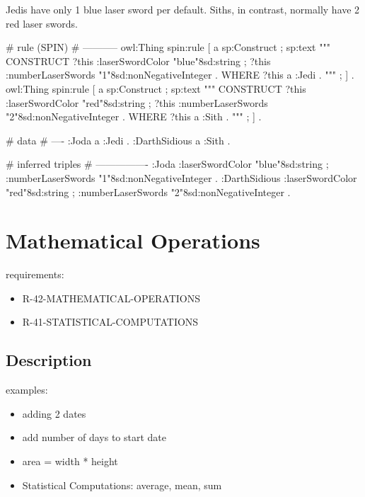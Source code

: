 \documentclass{llncs}
\begin{document}
Jedis have only 1 blue laser sword per default.
Siths, in contrast, normally have 2 red laser swords.

\begin{ex}
# rule (SPIN)
# -----------
owl:Thing
    spin:rule [
        a sp:Construct ;
            sp:text """
                CONSTRUCT {            
                    ?this :laserSwordColor "blue"^^xsd:string ;
                    ?this :numberLaserSwords "1"^^xsd:nonNegativeInteger . 
                }
                WHERE {             
                    ?this a :Jedi .            
                } """ ; ] .
owl:Thing
    spin:rule [
        a sp:Construct ;
            sp:text """
                CONSTRUCT {
                    ?this :laserSwordColor "red"^^xsd:string ;
                    ?this :numberLaserSwords "2"^^xsd:nonNegativeInteger . 
                }
                WHERE {             
                    ?this a :Sith .            
                } """ ; ] .
\end{ex}

\begin{ex}
# data
# ----
:Joda a :Jedi .
:DarthSidious a :Sith .
\end{ex}

\begin{ex}
# inferred triples
# ----------------
:Joda 
    :laserSwordColor "blue"^^xsd:string ;
    :numberLaserSwords "1"^^xsd:nonNegativeInteger .
:DarthSidious 
    :laserSwordColor "red"^^xsd:string ;
    :numberLaserSwords "2"^^xsd:nonNegativeInteger .
\end{ex}

\section{Mathematical Operations}

requirements:

\begin{itemize}
	\item R-42-MATHEMATICAL-OPERATIONS
	\item R-41-STATISTICAL-COMPUTATIONS
\end{itemize}

\subsection{Description}

examples:

\begin{itemize}
	\item adding 2 dates
	\item add number of days to start date
	\item area = width * height
	\item Statistical Computations: average, mean, sum
\end{itemize}
\end{document}
